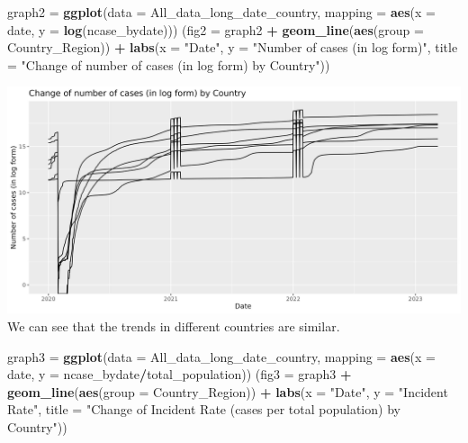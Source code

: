 \documentclass[
]{article}
\newenvironment{Shaded}{\begin{snugshade}}{\end{snugshade}}
\newcommand{\AttributeTok}[1]{\textcolor[rgb]{0.13,0.29,0.53}{#1}}
\newcommand{\FunctionTok}[1]{\textcolor[rgb]{0.13,0.29,0.53}{\textbf{#1}}}
\newcommand{\NormalTok}[1]{#1}
\newcommand{\OtherTok}[1]{\textcolor[rgb]{0.56,0.35,0.01}{#1}}
\newcommand{\SpecialCharTok}[1]{\textcolor[rgb]{0.81,0.36,0.00}{\textbf{#1}}}
\newcommand{\StringTok}[1]{\textcolor[rgb]{0.31,0.60,0.02}{#1}}
\begin{document}
\begin{Shaded}
\begin{Highlighting}[]
\NormalTok{graph2 }\OtherTok{=} \FunctionTok{ggplot}\NormalTok{(}\AttributeTok{data =}\NormalTok{ All\_data\_long\_date\_country, }\AttributeTok{mapping =} \FunctionTok{aes}\NormalTok{(}\AttributeTok{x =}\NormalTok{ date, }\AttributeTok{y =} \FunctionTok{log}\NormalTok{(ncase\_bydate)))}
\NormalTok{(}\AttributeTok{fig2 =}\NormalTok{ graph2 }\SpecialCharTok{+} \FunctionTok{geom\_line}\NormalTok{(}\FunctionTok{aes}\NormalTok{(}\AttributeTok{group =}\NormalTok{ Country\_Region)) }\SpecialCharTok{+} 
    \FunctionTok{labs}\NormalTok{(}\AttributeTok{x =} \StringTok{"Date"}\NormalTok{, }\AttributeTok{y =} \StringTok{"Number of cases (in log form)"}\NormalTok{, }
         \AttributeTok{title =} \StringTok{"Change of number of cases (in log form) by Country"}\NormalTok{))}
\end{Highlighting}
\end{Shaded}

\includegraphics{./fig2.jpeg} We can see that the trends in different
countries are similar.\\

\begin{Shaded}
\begin{Highlighting}[]
\NormalTok{graph3 }\OtherTok{=} \FunctionTok{ggplot}\NormalTok{(}\AttributeTok{data =}\NormalTok{ All\_data\_long\_date\_country, }\AttributeTok{mapping =} \FunctionTok{aes}\NormalTok{(}\AttributeTok{x =}\NormalTok{ date, }\AttributeTok{y =}\NormalTok{ ncase\_bydate}\SpecialCharTok{/}\NormalTok{total\_population))}
\NormalTok{(}\AttributeTok{fig3 =}\NormalTok{ graph3 }\SpecialCharTok{+} \FunctionTok{geom\_line}\NormalTok{(}\FunctionTok{aes}\NormalTok{(}\AttributeTok{group =}\NormalTok{ Country\_Region)) }\SpecialCharTok{+} 
    \FunctionTok{labs}\NormalTok{(}\AttributeTok{x =} \StringTok{"Date"}\NormalTok{, }\AttributeTok{y =} \StringTok{"Incident Rate"}\NormalTok{, }
         \AttributeTok{title =} \StringTok{"Change of Incident Rate (cases per total population) by Country"}\NormalTok{))}
\end{Highlighting}
\end{Shaded}
\end{document}
